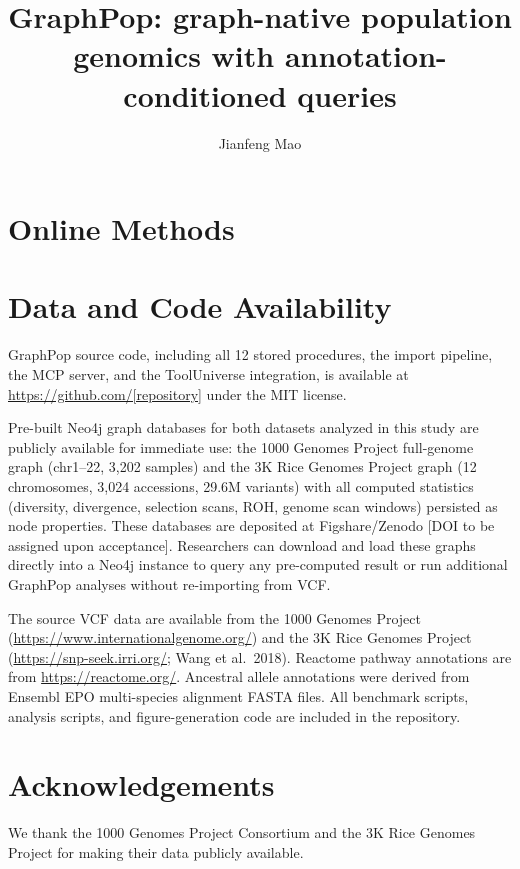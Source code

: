 \documentclass[10pt]{article}
\title{\textbf{GraphPop: graph-native population genomics with annotation-conditioned queries}}
\author[1]{Jianfeng Mao}
\affil[1]{Affiliation}
\date{}
\begin{document}
\maketitle









\section*{Online Methods}


\section*{Data and Code Availability}
GraphPop source code, including all 12 stored procedures, the import pipeline, the MCP server, and the ToolUniverse integration, is available at \url{https://github.com/[repository]} under the MIT license.

Pre-built Neo4j graph databases for both datasets analyzed in this study are publicly available for immediate use: the 1000 Genomes Project full-genome graph (chr1--22, 3{,}202 samples) and the 3K Rice Genomes Project graph (12 chromosomes, 3{,}024 accessions, 29.6M variants) with all computed statistics (diversity, divergence, selection scans, ROH, genome scan windows) persisted as node properties. These databases are deposited at Figshare/Zenodo [DOI to be assigned upon acceptance]. Researchers can download and load these graphs directly into a Neo4j instance to query any pre-computed result or run additional GraphPop analyses without re-importing from VCF.

The source VCF data are available from the 1000 Genomes Project (\url{https://www.internationalgenome.org/}) and the 3K Rice Genomes Project (\url{https://snp-seek.irri.org/}; Wang et al.\ 2018). Reactome pathway annotations are from \url{https://reactome.org/}. Ancestral allele annotations were derived from Ensembl EPO multi-species alignment FASTA files. All benchmark scripts, analysis scripts, and figure-generation code are included in the repository.

\section*{Acknowledgements}
We thank the 1000 Genomes Project Consortium and the 3K Rice Genomes Project for making their data publicly available.
\end{document}
